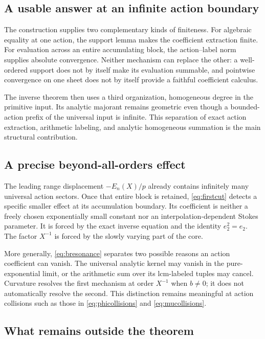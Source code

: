 \documentclass[11pt,a4paper]{article}
\numberwithin{equation}{section}
\theoremstyle{definition}
\theoremstyle{remark}
\begin{document}
\subsection{A usable answer at an infinite action boundary}

The construction supplies two complementary kinds of finiteness.
For algebraic equality at one action, the support lemma makes the
coefficient extraction finite. For evaluation across an entire
accumulating block, the action--label norm supplies absolute convergence.
Neither mechanism can replace the other: a well-ordered support does
not by itself make its evaluation summable, and pointwise convergence
on one sheet does not by itself provide a faithful coefficient calculus.

The inverse theorem then uses a third organization, homogeneous degree
in the primitive input. Its analytic majorant remains geometric even
though a bounded-action prefix of the universal input is infinite.
This separation of exact action extraction, arithmetic labeling, and
analytic homogeneous summation is the main structural contribution.

\subsection{A precise beyond-all-orders effect}

The leading range displacement $-E_n(X)/p$ already contains infinitely
many universal action sectors. Once that entire block is retained,
\eqref{eq:firstcut} detects a specific smaller effect at its accumulation
boundary. Its coefficient is neither a freely chosen exponentially
small constant nor an interpolation-dependent Stokes parameter. It is
forced by the exact inverse equation and the identity $e_2^2=e_2$.
The factor $X^{-1}$ is forced by the slowly varying part of the core.

More generally, \eqref{eq:bresonance} separates two possible reasons an
action coefficient can vanish. The universal analytic kernel may vanish
in the pure-exponential limit, or the arithmetic sum over its lcm-labeled
tuples may cancel. Curvature resolves the first mechanism at order
$X^{-1}$ when $b\ne0$; it does not automatically resolve the second.
This distinction remains meaningful at action collisions such as those
in \eqref{eq:phicollisions} and \eqref{eq:mucollisions}.

\subsection{What remains outside the theorem}
\end{document}
